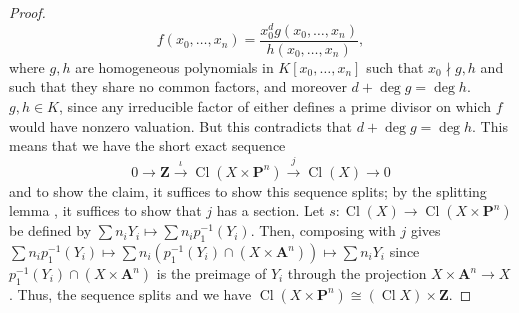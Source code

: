 \documentclass[10pt]{article}
\theoremstyle{definition}
\theoremstyle{remark}
\numberwithin{equation}{section}
\numberwithin{figure}{subsubsection}
\DeclareMathOperator{\Cl}{Cl}
\begin{document}
\begin{proof}
  \begin{equation*}
    f(x_0,\ldots,x_n) = \frac{x_0^dg(x_0,\ldots,x_n)}{h(x_0,\ldots,x_n)},
  \end{equation*}
  where $g,h$ are homogeneous polynomials in $K[x_0,\ldots,x_n]$ such that $x_0 \nmid g,h$ and such that they share no common factors, and moreover $d + \deg g = \deg h$. $g,h \in K$, since any irreducible factor of either defines a prime divisor on which $f$ would have nonzero valuation. But this contradicts that $d + \deg g = \deg h$. This means that we have the short exact sequence
  \begin{equation*}
    0 \longrightarrow \mathbf{Z} \overset{\iota}{\longrightarrow} \Cl(X \times \mathbf{P}^n) \overset{j}{\longrightarrow} \Cl(X) \longrightarrow 0
  \end{equation*}
  and to show the claim, it suffices to show this sequence splits; by the splitting lemma \cite[Prop.-Def.~2.10]{Rei95}, it suffices to show that $j$ has a section. Let $s \colon \Cl(X) \to \Cl(X \times \mathbf{P}^n)$ be defined by $\sum n_iY_i \mapsto \sum n_i p_1^{-1}(Y_i)$. Then, composing with $j$ gives $\sum n_i p_1^{-1}(Y_i) \mapsto \sum n_i (p_1^{-1}(Y_i) \cap (X \times \mathbf{A}^n)) \mapsto \sum n_iY_i$ since $p_1^{-1}(Y_i) \cap (X \times \mathbf{A}^n)$ is the preimage of $Y_i$ through the projection $X \times \mathbf{A}^n \to X$. Thus, the sequence splits and we have $\Cl(X \times \mathbf{P}^n) \cong (\Cl X) \times \mathbf{Z}$.
\end{proof}
\end{document}

